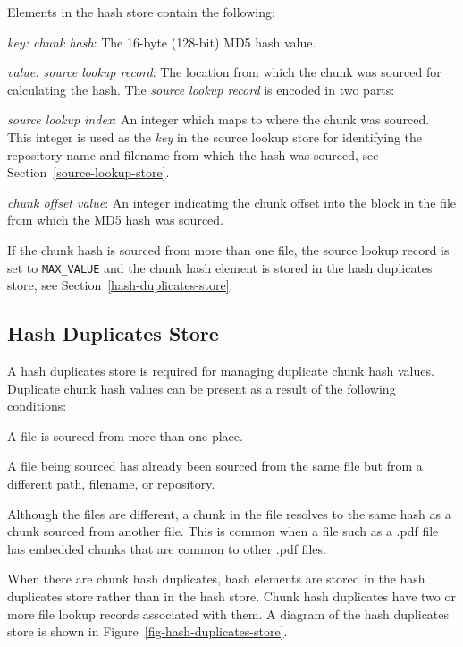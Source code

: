\documentclass[10pt,twoside]{article}
\begin{document}
Elements in the hash store contain the following:
\begin{compactitem}
\item \emph{key: chunk hash}: The 16-byte (128-bit) MD5 hash value.
\item \emph{value: source lookup record}: The location from which the chunk was sourced
for calculating the hash.
The \emph{source lookup record} is encoded in two parts:
\begin{compactenum}
\item \emph{source lookup index}: An integer which maps to where the chunk was sourced.
This integer is used as the \emph{key} in the source lookup store
for identifying the repository name and filename
from which the hash was sourced, see Section~\ref{source-lookup-store}.
\item \emph{chunk offset value}: An integer indicating the chunk offset into the block in the file
from which the MD5 hash was sourced.
\end{compactenum}
\end{compactitem}
If the chunk hash is sourced from more than one file,
the source lookup record is set to \texttt{MAX\_VALUE}
and the chunk hash element is stored in the hash duplicates store,
see Section~\ref{hash-duplicates-store}.

\subsection{Hash Duplicates Store\label{hash-duplicates-store}}
A hash duplicates store is required for managing duplicate chunk hash values.
Duplicate chunk hash values can be present as a result of the following conditions:
\begin{compactitem}
\item A file is sourced from more than one place.
\item A file being sourced has already been sourced from the same file
but from a different path, filename, or repository.
\item Although the files are different, a chunk in the file resolves to the same hash as a chunk sourced from another file.
This is common when a file such as a .pdf file has embedded chunks
that are common to other .pdf files.
\end{compactitem}
When there are chunk hash duplicates,
hash elements are stored in the hash duplicates store rather than in the hash store.
Chunk hash duplicates have two or more file lookup records associated with them.
A diagram of the hash duplicates store is shown in Figure~\ref{fig-hash-duplicates-store}.
\end{document}
